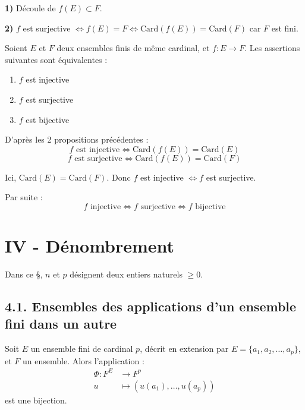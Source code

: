 \documentclass[a4paper,11pt]{article}
\begin{document}
\begin{demonstration}
    \textbf{1)} Découle de $f(E) \subset F$.
    
    \textbf{2)} $f$ est surjective $\iff f(E) = F \iff \text{Card}(f(E)) = \text{Card}(F)$ car $F$ est fini.
\end{demonstration}

\begin{theoreme}
    Soient $E$ et $F$ deux ensembles finis de même cardinal, et $f : E \to F$. Les assertions suivantes sont équivalentes :
    \begin{enumerate}
        \item[(i)] $f$ est injective
        \item[(ii)] $f$ est surjective
        \item[(iii)] $f$ est bijective
    \end{enumerate}
\end{theoreme}


\begin{demonstration}
  D'après les 2 propositions précédentes :
  $$ f \text{ est injective} \iff \text{Card}(f(E)) = \text{Card}(E) $$
  $$ f \text{ est surjective} \iff \text{Card}(f(E)) = \text{Card}(F) $$
  
  Ici, $\text{Card}(E) = \text{Card}(F)$. Donc $f$ est injective $\iff f$ est surjective.
  
  Par suite :
  $$ f \text{ injective} \iff f \text{ surjective} \iff f \text{ bijective} $$
\end{demonstration}


\newpage
\section{IV - Dénombrement}

Dans ce \S, $n$ et $p$ désignent deux entiers naturels $\ge 0$.

\subsection{4.1. Ensembles des applications d'un ensemble fini dans un autre}

\begin{proposition}
  Soit $E$ un ensemble fini de cardinal $p$, décrit en extension par $E = \{a_1, a_2, \dots, a_p\}$, et $F$ un ensemble.
  Alors l'application :
  \begin{align*}
    \Phi : F^E &\longrightarrow F^p \\
    u &\longmapsto (u(a_1), \dots, u(a_p))
  \end{align*}
  est une bijection.
\end{proposition}
\end{document}
